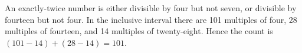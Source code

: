 An exactly-twice number is either divisible by four but not seven, or divisible by fourteen but not four. In the inclusive interval there are 101 multiples of four, 28 multiples of fourteen, and 14 multiples of twenty-eight. Hence the count is $(101-14)+(28-14)=\boxed{101}$.
